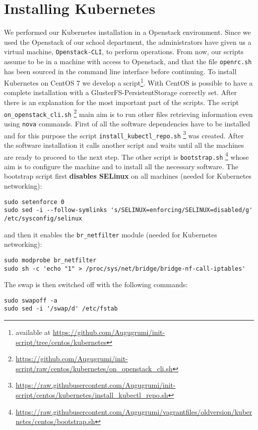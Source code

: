 \section{Installing Kubernetes}
\label{installing-kubernetes}

We performed our Kubernetes installation in a Openstack environment. Since we
used the Openstack of our school department, the administrators have given us a
virtual machine, \verb!Openstack-CLI!, to perform operations. From now, our
scripts assume to be in a machine with access to Openstack, and that the file
\verb!openrc.sh! has been sourced in the command line interface before
continuing. To install Kubernetes on CentOS 7 we develop a
script\footnote{available at
  \url{https://github.com/Augugrumi/init-script/tree/centos/kubernetes}}. With
CentOS is possible to have a complete installation with a
GlusterFS-PersistentStorage correctly set. After there is an explanation for the
most important part of the scripts. The script \verb!on_openstack_cli.sh!
\footnote{\url{https://github.com/Augugrumi/init-script/raw/centos/kubernetes/on_openstack_cli.sh}}
main aim is to run other files retrieving information even using \texttt{nova}
commands. First of all the software dependencies have to be installed and for
this purpose the script \verb!install_kubectl_repo.sh!
\footnote{\url{https://raw.githubusercontent.com/Augugrumi/init-script/centos/kubernetes/install_kubectl_repo.sh}}
was created. After the software installation it calls another script and waits
until all the machines are ready to proceed to the next step. The other script
is \verb!bootstrap.sh!
\footnote{\url{https://raw.githubusercontent.com/Augugrumi/vagrantfiles/oldversion/kubernetes/centos/bootstrap.sh}}
whose aim is to configure the machine and to install all the necessary
software. The bootstrap script first \textbf{disables SELinux} on all machines 
(needed for Kubernetes networking):
\begin{lstlisting}
sudo setenforce 0
sudo sed -i --follow-symlinks 's/SELINUX=enforcing/SELINUX=disabled/g' /etc/sysconfig/selinux
\end{lstlisting}
and then it enables the \verb!br_netfilter! module (needed for Kubernetes
networking):
\begin{lstlisting}
sudo modprobe br_netfilter
sudo sh -c 'echo "1" > /proc/sys/net/bridge/bridge-nf-call-iptables'
\end{lstlisting}
The swap is then switched off with the following commands:
\begin{lstlisting}
sudo swapoff -a
sudo sed -i '/swap/d' /etc/fstab
\end{lstlisting}
